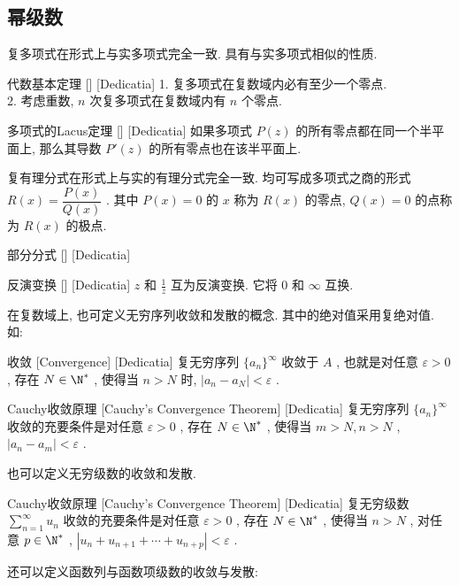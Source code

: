 \documentclass[UTF8]{ctexart}
\begin{document}
\subsection{幂级数}
复多项式在形式上与实多项式完全一致. 具有与实多项式相似的性质. 
\begin{thm}
    [UUID]
    {代数基本定理}
    []
    [Dedicatia]
    1. 复多项式在复数域内必有至少一个零点. \\
    2. 考虑重数,  \( n \) 次复多项式在复数域内有 \( n \) 个零点. 
\end{thm}
\begin{thm}
    [UUID]
    {多项式的Lacus定理}
    []
    [Dedicatia]
    如果多项式 \( P(z) \) 的所有零点都在同一个半平面上, 那么其导数 \( P'(z) \) 的所有零点也在该半平面上. 
\end{thm}
复有理分式在形式上与实的有理分式完全一致. 均可写成多项式之商的形式 \( R(x)=\dfrac{P(x)}{Q(x)} \) . 其中 \( P(x)=0 \) 的 \( x \) 称为 \( R(x) \) 的零点,  \( Q(x)=0 \) 的点称为 \( R(x) \) 的极点. 
\begin{dfn}
    [UUID]
    {部分分式}
    []
    [Dedicatia]
\end{dfn}
\begin{dfn}
    [UUID]
    {反演变换}
    []
    [Dedicatia]
     \( z \) 和 \( \frac{1}{z} \) 互为反演变换. 它将 \( 0 \) 和 \( \infty \) 互换. 
\end{dfn}
在复数域上, 也可定义无穷序列收敛和发散的概念. 其中的绝对值采用复绝对值. 如: 
\begin{dfn}
    [UUID]
    {收敛}
    [Convergence]
    [Dedicatia]
    复无穷序列 \( \{a_n\}^\infty \) 收敛于 \( A \) , 也就是对任意 \( \varepsilon>0 \) , 存在 \( N\in\N^* \) , 使得当 \( n>N \) 时,  \( |a_n-a_N|<\varepsilon \) .
\end{dfn}
\begin{thm}
    [UUID]
    {Cauchy收敛原理}
    [Cauchy's Convergence Theorem]
    [Dedicatia]
    复无穷序列 \( \{a_n\}^\infty \) 收敛的充要条件是对任意 \( \varepsilon>0 \) , 存在 \( N\in\N^* \) , 使得当 \( m>N, n>N \) ,  \( |a_n-a_m|<\varepsilon \) .
\end{thm}
也可以定义无穷级数的收敛和发散. 
\begin{thm}
    [UUID]
    {Cauchy收敛原理}
    [Cauchy's Convergence Theorem]
    [Dedicatia]
    复无穷级数 \( \sum_{n = 1}^{\infty} u_n \) 收敛的充要条件是对任意 \( \varepsilon>0 \) , 存在 \( N\in\N^* \) , 使得当 \( n>N \) , 对任意 \( p\in\N^* \) ,  \( |u_n+u_{n+1}+\cdots+u_{n+p}|<\varepsilon \) .
\end{thm}
还可以定义函数列与函数项级数的收敛与发散: 
\end{document}
